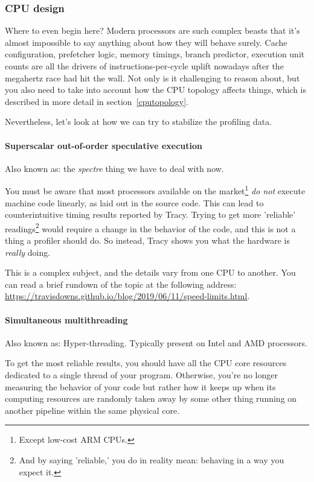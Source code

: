 \documentclass[hidelinks,titlepage,a4paper]{article}
\begin{document}
\subsubsection{CPU design}
\label{checkenvironmentcpu}

Where to even begin here? Modern processors are such complex beasts that it's almost impossible to say anything about how they will behave surely. Cache configuration, prefetcher logic, memory timings, branch predictor, execution unit counts are all the drivers of instructions-per-cycle uplift nowadays after the megahertz race had hit the wall. Not only is it challenging to reason about, but you also need to take into account how the CPU topology affects things, which is described in more detail in section~\ref{cputopology}.

Nevertheless, let's look at how we can try to stabilize the profiling data.

\paragraph{Superscalar out-of-order speculative execution}

Also known as: the \emph{spectre} thing we have to deal with now.

You must be aware that most processors available on the market\footnote{Except low-cost ARM CPUs.} \emph{do not} execute machine code linearly, as laid out in the source code. This can lead to counterintuitive timing results reported by Tracy. Trying to get more 'reliable' readings\footnote{And by saying 'reliable,' you do in reality mean: behaving in a way you expect it.} would require a change in the behavior of the code, and this is not a thing a profiler should do. So instead, Tracy shows you what the hardware is \emph{really} doing.

This is a complex subject, and the details vary from one CPU to another. You can read a brief rundown of the topic at the following address: \url{https://travisdowns.github.io/blog/2019/06/11/speed-limits.html}.

\paragraph{Simultaneous multithreading}

Also known as: Hyper-threading. Typically present on Intel and AMD processors.

To get the most reliable results, you should have all the CPU core resources dedicated to a single thread of your program. Otherwise, you're no longer measuring the behavior of your code but rather how it keeps up when its computing resources are randomly taken away by some other thing running on another pipeline within the same physical core.
\end{document}
